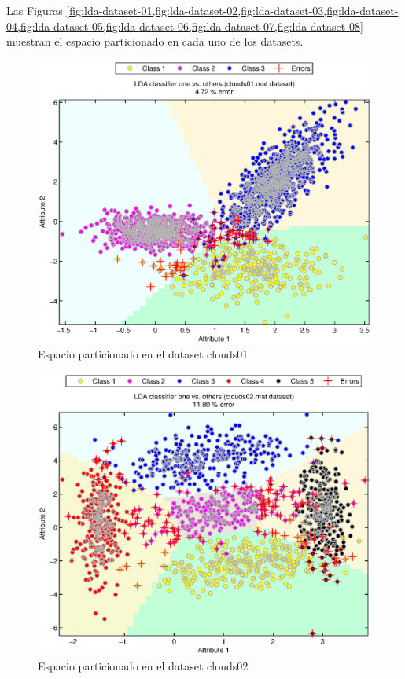 \documentclass[journal]{IEEEtran}
\begin{document}
Las Figuras \cref{fig:lda-dataset-01,fig:lda-dataset-02,fig:lda-dataset-03,fig:lda-dataset-04,fig:lda-dataset-05,fig:lda-dataset-06,fig:lda-dataset-07,fig:lda-dataset-08} muestran el espacio particionado en cada uno de los datasets.
\begin{figure}[tb]
	\begin{center}
		\includegraphics[width=\columnwidth]{imagenes/clouds01}
	\end{center}
	\caption{Espacio particionado en el dataset clouds01}
	\label{fig:lda-dataset-01}
\end{figure}

\begin{figure}[tb]
	\begin{center}
		\includegraphics[width=\columnwidth]{imagenes/clouds02}
	\end{center}
	\caption{Espacio particionado en el dataset clouds02}
	\label{fig:lda-dataset-02}
\end{figure}
\end{document}
